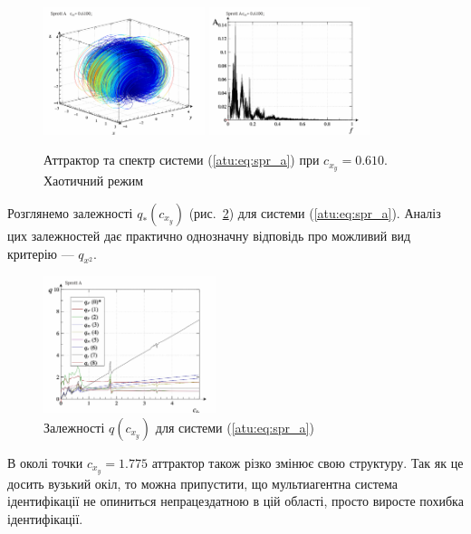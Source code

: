 \documentclass[a4paper,13pt]{atuaref}
\begin{document}
\begin{figure}[htb!]
\centerline{
  \includegraphics[width=0.42\textwidth]{p5/p/cha/spr_a/sprott_a-p_xyz_cx_y=0x610.png}
  \includegraphics[width=0.42\textwidth]{p5/p/cha/spr_a/sprott_a_f-p_f_cx_y=0x610.png}
}
\caption{Аттрактор та спектр системи (\ref{atu:eq:spr_a}) при $ c_{x_y} =0.610 $.
  Хаотичний режим
}
\label{atu:f:spr_a_p_0610}
\end{figure}

Розглянемо залежності $q_{*}(c_{x_y}) $ (рис.~\ref{atu:f:spr_a_q})
для системи (\ref{atu:eq:spr_a}). Аналіз цих залежностей дає практично
однозначну відповідь про можливий вид критерію --- $ q_{x^2} $.

\begin{figure}[htb!]
\centerline{
  \includegraphics[width=0.45\textwidth]{p5/p/cha/spr_a/sprott_a_q-p_c_x_y.png}
}
\caption{Залежності $q(c_{x_y})$ для системи (\ref{atu:eq:spr_a}) }
\label{atu:f:spr_a_q}
\end{figure}

В околі точки $ c_ {x_y} = 1.775 $ аттрактор також різко змінює свою
структуру. Так як це досить вузький окіл, то можна припустити, що
мультиагентна система ідентифікації не опиниться непрацездатною в цій області,
просто виросте похибка ідентифікації.
\end{document}
